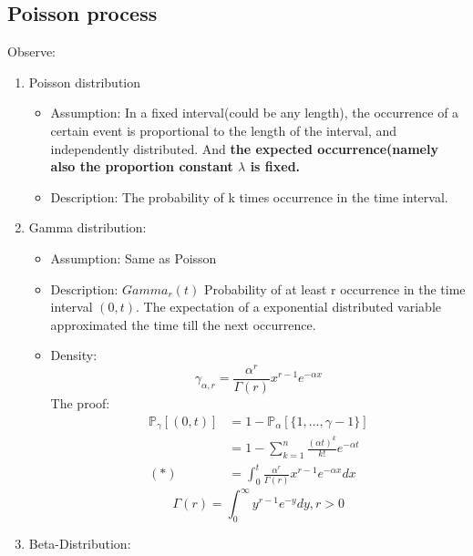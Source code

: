 \subsection{Poisson process}
\begin{review}Observe: 
\begin{enumerate}
    \item Poisson distribution \begin{itemize}
        \item Assumption: In a fixed interval(could be any length), the occurrence of a certain event is proportional to the length of the interval, and independently distributed. And \textbf{the expected occurrence(namely also the proportion constant $\lambda$ is fixed.}
        \item Description: The probability of k times occurrence in the time interval. 
        \end{itemize}
    \item Gamma distribution:\begin{itemize}
        \item Assumption: Same as Poisson
        \item Description: $Gamma_r(t)$ Probability of at least r occurrence in  the time interval $(0, t)$. The expectation of a exponential distributed variable approximated the time till the next occurrence.
        \item Density:\begin{equation}
            \gamma_{\alpha, r} = \frac{\alpha^r}{\Gamma(r)} x^{r -1 } e^{- \alpha x}
        \end{equation}
        The proof:
        \begin{equation*}
        \begin{aligned}
            \mathbb{P}_{\gamma}[(0, t)] &= 1 - \mathbb{P}_{\alpha}[\{ 1, \dots,  \gamma - 1\}] \\
            &= 1 - \sum_{k = 1}^{n} \frac{(\alpha t)^k}{k!} e^{-\alpha t}\\
            (*)&= \int_0^t\frac{\alpha^r}{\Gamma(r)} x^{r -1 } e^{- \alpha x} dx
            \end{aligned}
        \end{equation*}
        \begin{equation}
            \Gamma(r) = \int_{0}^{\infty} y^{r - 1} e^{-y} dy, r > 0
        \end{equation}
        \end{itemize}
    \item Beta-Distribution:
\end{enumerate}
\end{review}

